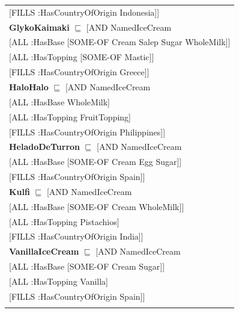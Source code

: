 \documentclass[12pt]{article}
\newcommand*{\MyIndent}{\hspace*{7em}}
\begin{document}
\begin{tabularx}{1\textwidth}{@{}X@{}}
                                                    \MyIndent [FILLS :HasCountryOfOrigin Indonesia]] \\
        	\textbf{GlykoKaimaki} $\sqsubseteq$ [AND NamedIceCream \\
                                                    \MyIndent [ALL :HasBase [SOME-OF Cream Salep Sugar WholeMilk]] \\
                                                    \MyIndent [ALL :HasTopping [SOME-OF Mastic]] \\
                                                    \MyIndent [FILLS :HasCountryOfOrigin Greece]] \\
        	\textbf{HaloHalo} $\sqsubseteq$ [AND NamedIceCream \\
                                                    \MyIndent [ALL :HasBase WholeMilk] \\
                                                    \MyIndent [ALL :HasTopping FruitTopping] \\
                                                    \MyIndent [FILLS :HasCountryOfOrigin Philippines]] \\
        	\textbf{HeladoDeTurron} $\sqsubseteq$ [AND NamedIceCream \\
                                                    \MyIndent [ALL :HasBase [SOME-OF Cream Egg Sugar]] \\
                                                    \MyIndent [FILLS :HasCountryOfOrigin Spain]] \\
        	\textbf{Kulfi} $\sqsubseteq$ [AND NamedIceCream \\
                                                    \MyIndent [ALL :HasBase [SOME-OF Cream WholeMilk]] \\
                                                    \MyIndent [ALL :HasTopping Pistachios] \\
                                                    \MyIndent [FILLS :HasCountryOfOrigin India]] \\
        	\textbf{VanillaIceCream} $\sqsubseteq$ [AND NamedIceCream \\
                                                    \MyIndent [ALL :HasBase [SOME-OF Cream Sugar]] \\
                                                    \MyIndent [ALL :HasTopping Vanilla] \\
                                                    \MyIndent [FILLS :HasCountryOfOrigin Spain]] \\
                                                    \tabularnewline


\end{tabularx}
\end{document}

